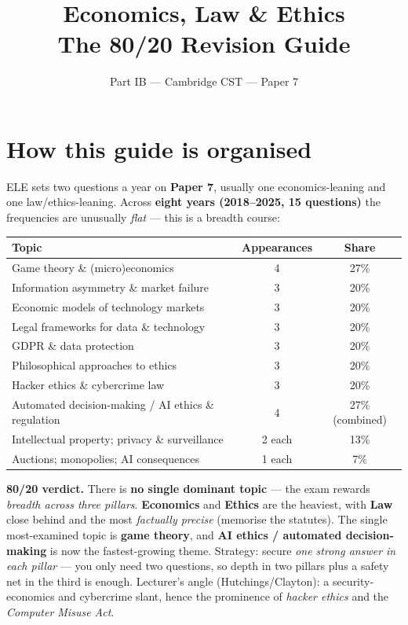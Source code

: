 \documentclass[11pt,a4paper]{article}
\title{\vspace{-1.5cm}\textbf{Economics, Law \& Ethics} \\[2pt] \large The 80/20 Revision Guide}
\author{\small Part IB --- Cambridge CST --- Paper 7}
\date{}
\begin{document}
\maketitle
\vspace{-0.8cm}

\section*{How this guide is organised}

ELE sets two questions a year on \textbf{Paper 7}, usually one economics-leaning and one law/ethics-leaning. Across \textbf{eight years (2018--2025, 15 questions)} the frequencies are unusually \emph{flat} --- this is a breadth course:

\begin{center}
\begin{tabular}{lcc}
\hline
\textbf{Topic} & \textbf{Appearances} & \textbf{Share} \\
\hline
Game theory \& (micro)economics & 4 & 27\% \\
Information asymmetry \& market failure & 3 & 20\% \\
Economic models of technology markets & 3 & 20\% \\
Legal frameworks for data \& technology & 3 & 20\% \\
GDPR \& data protection & 3 & 20\% \\
Philosophical approaches to ethics & 3 & 20\% \\
Hacker ethics \& cybercrime law & 3 & 20\% \\
Automated decision-making / AI ethics \& regulation & 4 & 27\% (combined) \\
Intellectual property; privacy \& surveillance & 2 each & 13\% \\
Auctions; monopolies; AI consequences & 1 each & 7\% \\
\hline
\end{tabular}
\end{center}

\textbf{80/20 verdict.} There is \textbf{no single dominant topic} --- the exam rewards \emph{breadth across three pillars}. \textbf{Economics} and \textbf{Ethics} are the heaviest, with \textbf{Law} close behind and the most \emph{factually precise} (memorise the statutes). The single most-examined topic is \textbf{game theory}, and \textbf{AI ethics / automated decision-making} is now the fastest-growing theme. Strategy: secure \emph{one strong answer in each pillar} --- you only need two questions, so depth in two pillars plus a safety net in the third is enough. Lecturer's angle (Hutchings/Clayton): a security-economics and cybercrime slant, hence the prominence of \emph{hacker ethics} and the \emph{Computer Misuse Act}.
\end{document}
